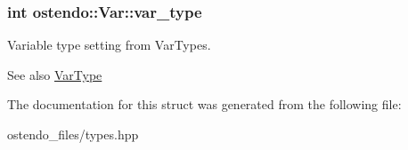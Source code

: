 \subsubsection[{\texorpdfstring{var\+\_\+type}{var_type}}]{\setlength{\rightskip}{0pt plus 5cm}int ostendo\+::\+Var\+::var\+\_\+type}\hypertarget{structostendo_1_1Var_a92514adaf052e5007dbe53dda9de008f}{}\label{structostendo_1_1Var_a92514adaf052e5007dbe53dda9de008f}
Variable type setting from Var\+Types.\begin{DoxySeeAlso}{See also}
\hyperlink{namespaceostendo_ae78fb0e171a88eb8820d8d6a894463f4}{Var\+Type} 
\end{DoxySeeAlso}


The documentation for this struct was generated from the following file\+:\begin{DoxyCompactItemize}
\item 
ostendo\+\_\+files/types.\+hpp\end{DoxyCompactItemize}
